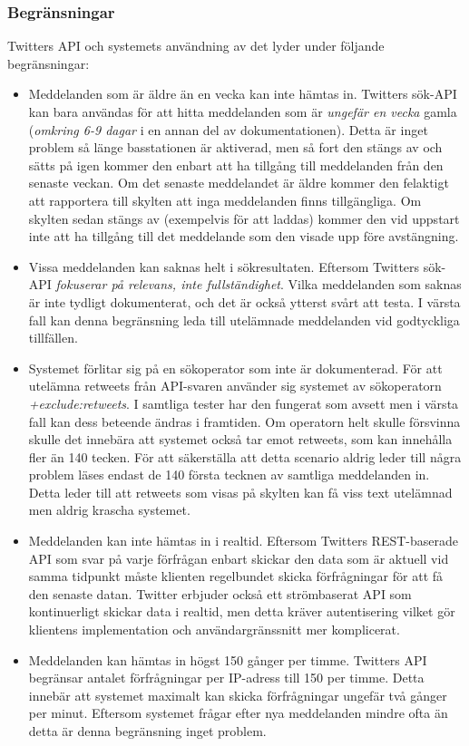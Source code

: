 \documentclass[a4paper,11pt]{article}
\begin{document}
\subsubsection{Begränsningar}
Twitters API och systemets användning av det lyder under följande begränsningar:
	
	\begin{itemize}
    	\item Meddelanden som är äldre än en vecka kan inte hämtas in. Twitters sök-API kan bara användas för att hitta meddelanden som är {\it ungefär en vecka} gamla ({\it omkring 6-9 dagar} i en annan del av dokumentationen). Detta är inget problem så länge basstationen är aktiverad, men så fort den stängs av och sätts på igen kommer den enbart att ha tillgång till meddelanden från den senaste veckan. Om det senaste meddelandet är äldre kommer den felaktigt att rapportera till skylten att inga meddelanden finns tillgängliga. Om skylten sedan stängs av (exempelvis för att laddas) kommer den vid uppstart inte att ha tillgång till det meddelande som den visade upp före avstängning.
    	\item Vissa meddelanden kan saknas helt i sökresultaten. Eftersom Twitters sök-API {\it fokuserar på relevans, inte fullständighet}. Vilka meddelanden som saknas är inte tydligt dokumenterat, och det är också ytterst svårt att testa. I värsta fall kan denna begränsning leda till utelämnade meddelanden vid godtyckliga tillfällen.
    	\item Systemet förlitar sig på en sökoperator som inte är dokumenterad. För att utelämna retweets från API-svaren använder sig systemet av sökoperatorn {\it +exclude:retweets}. I samtliga tester har den fungerat som avsett men i värsta fall kan dess beteende ändras i framtiden. Om operatorn helt skulle försvinna skulle det innebära att systemet också tar emot retweets, som kan innehålla fler än 140 tecken. För att säkerställa att detta scenario aldrig leder till några problem läses endast de 140 första tecknen av samtliga meddelanden in. Detta leder till att retweets som visas på skylten kan få viss text utelämnad men aldrig krascha systemet.
    	\item Meddelanden kan inte hämtas in i realtid. Eftersom Twitters REST-baserade API som svar på varje förfrågan enbart skickar den data som är aktuell vid samma tidpunkt måste klienten regelbundet skicka förfrågningar för att få den senaste datan. Twitter erbjuder också ett strömbaserat API som kontinuerligt skickar data i realtid, men detta kräver autentisering vilket gör klientens implementation och användargränssnitt mer komplicerat.
    	\item Meddelanden kan hämtas in högst 150 gånger per timme. Twitters API begränsar antalet förfrågningar per IP-adress till 150 per timme. Detta innebär att systemet maximalt kan skicka förfrågningar ungefär två gånger per minut. Eftersom systemet frågar efter nya meddelanden mindre ofta än detta är denna begränsning inget problem.
    	\end{itemize}
    	
\end{document}
